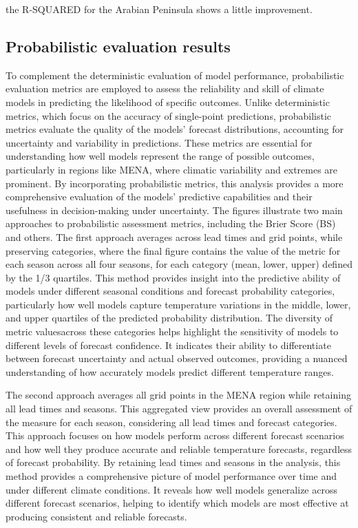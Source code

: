 the R-SQUARED for the Arabian Peninsula shows a little improvement.

\subsection{Probabilistic evaluation results}

To complement the deterministic evaluation of model performance, probabilistic evaluation metrics are employed to assess the reliability and skill of climate models in predicting the likelihood of specific outcomes. Unlike deterministic metrics, which focus on the accuracy of single-point predictions, probabilistic metrics evaluate the quality of the models’ forecast distributions, accounting for uncertainty and variability in predictions. These metrics are essential for understanding how well models represent the range of possible outcomes, particularly in regions like MENA, where climatic variability and extremes are prominent. By incorporating probabilistic metrics, this analysis provides a more comprehensive evaluation of the models’ predictive capabilities and their usefulness in decision-making under uncertainty.
The figures illustrate two main approaches to probabilistic assessment metrics, including the Brier Score (BS) and others. The first approach averages across lead times and grid points, while preserving categories, where the final figure contains the value of the metric for each season across all four seasons, for each category (mean, lower, upper) defined by the 1/3 quartiles. This method provides insight into the predictive ability of models under different seasonal conditions and forecast probability categories, particularly how well models capture temperature variations in the middle, lower, and upper quartiles of the predicted probability distribution. The diversity of metric values ​​across these categories helps highlight the sensitivity of models to different levels of forecast confidence. It indicates their ability to differentiate between forecast uncertainty and actual observed outcomes, providing a nuanced understanding of how accurately models predict different temperature ranges.

The second approach averages all grid points in the MENA region while retaining all lead times and seasons. This aggregated view provides an overall assessment of the measure for each season, considering all lead times and forecast categories. This approach focuses on how models perform across different forecast scenarios and how well they produce accurate and reliable temperature forecasts, regardless of forecast probability. By retaining lead times and seasons in the analysis, this method provides a comprehensive picture of model performance over time and under different climate conditions. It reveals how well models generalize across different forecast scenarios, helping to identify which models are most effective at producing consistent and reliable forecasts.
